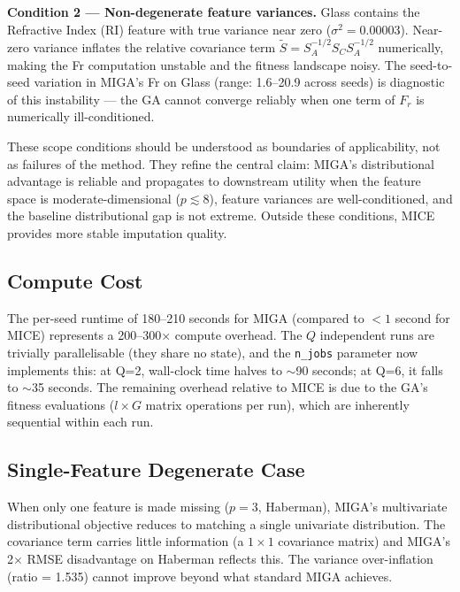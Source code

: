 \textbf{Condition 2 — Non-degenerate feature variances.} Glass contains the Refractive Index (RI) feature with true variance near zero ($\sigma^2 = 0.00003$). Near-zero variance inflates the relative covariance term $\tilde{S} = S_A^{-1/2} S_C S_A^{-1/2}$ numerically, making the Fr computation unstable and the fitness landscape noisy. The seed-to-seed variation in MIGA's Fr on Glass (range: 1.6--20.9 across seeds) is diagnostic of this instability --- the GA cannot converge reliably when one term of $F_r$ is numerically ill-conditioned.

These scope conditions should be understood as boundaries of applicability, not as failures of the method. They refine the central claim: MIGA's distributional advantage is reliable and propagates to downstream utility when the feature space is moderate-dimensional ($p \lesssim 8$), feature variances are well-conditioned, and the baseline distributional gap is not extreme. Outside these conditions, MICE provides more stable imputation quality.

\subsection{Compute Cost}

The per-seed runtime of 180--210 seconds for MIGA (compared to $<1$ second for MICE) represents a 200--300$\times$ compute overhead. The $Q$ independent runs are trivially parallelisable (they share no state), and the \texttt{n\_jobs} parameter now implements this: at Q=2, wall-clock time halves to $\sim$90 seconds; at Q=6, it falls to $\sim$35 seconds. The remaining overhead relative to MICE is due to the GA's fitness evaluations ($l \times G$ matrix operations per run), which are inherently sequential within each run.

\subsection{Single-Feature Degenerate Case}

When only one feature is made missing ($p = 3$, Haberman), MIGA's multivariate distributional objective reduces to matching a single univariate distribution. The covariance term carries little information (a $1 \times 1$ covariance matrix) and MIGA's 2$\times$ RMSE disadvantage on Haberman reflects this. The variance over-inflation (ratio = 1.535) cannot improve beyond what standard MIGA achieves.


